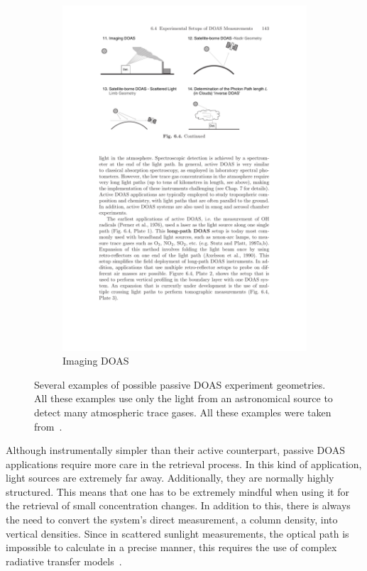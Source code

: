 \begin{figure}[htpb]
\begin{subfigure}[b]{.475\textwidth}
        \includegraphics[trim=3cm 23.7cm 12cm
        3cm, clip, width=\textwidth]{img/pdf/imaging.pdf}
        \caption{Imaging \gls{DOAS}}
        \label{fig:imagingDoas}
    \end{subfigure}
    \caption{Several examples of possible passive \gls{DOAS} experiment
    geometries. All these examples use only the light from an
    astronomical source to detect many atmospheric trace gases. All
    these examples were taken from~\cite{Platt2007}.}
    \label{fig:doasTypes}
\end{figure}

Although instrumentally simpler than their active counterpart, passive
\gls{DOAS} applications require more care in the retrieval process. In
this kind of application, light sources are extremely far away.
Additionally, they are normally highly structured. This means that one
has to be extremely mindful when using it for the retrieval of small
concentration changes. In addition to this, there is always the need to
convert the system's direct measurement, a column density, into vertical
densities. Since in scattered sunlight measurements, the optical path is
impossible to calculate in a precise manner, this requires the use of
complex radiative transfer models~\cite{Platt2007, Frins2006}.

